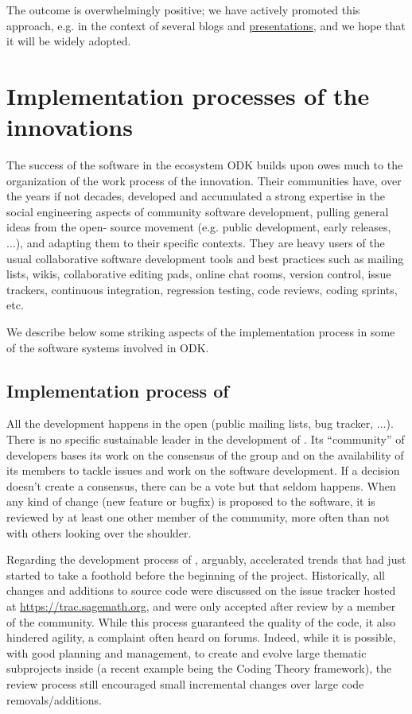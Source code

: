 \documentclass{deliverablereport}
\begin{document}
\begin{description}
  The outcome is overwhelmingly positive; we have actively promoted
  this approach, e.g. in the context of several blogs and
  \href{https://opendreamkit.org/2018/12/14/eu-proposal/}{presentations},
  and we hope that it will be widely adopted.
\end{description}


\section{Implementation processes of the innovations}

The success of the software in the ecosystem ODK builds upon owes much
to the organization of the work process of the innovation.
Their
communities have, over the years if not decades, developed and
accumulated a strong expertise in the social engineering aspects of
community software development, pulling general ideas from the open-
source movement (e.g. public development, early releases, ...), and
adapting them to their specific contexts. They are heavy users of the
usual collaborative software development tools and best practices such
as mailing lists, wikis, collaborative editing pads, online chat
rooms, version control, issue trackers, continuous integration,
regression testing, code reviews, coding sprints, etc.

We describe below some striking aspects of the implementation process
in some of the software systems involved in ODK.

\subsection{Implementation process of \Sage}

All the development happens in the open (public mailing lists, bug
tracker, ...). There is no specific sustainable leader in the
development of \Sage. Its ``community'' of developers bases its work on
the consensus of the group and on the availability of its members to
tackle issues and work on the software development. If a decision
doesn't create a consensus, there can be a vote but that seldom
happens. When any kind of change (new feature or bugfix)
is proposed to the software, it is reviewed
by at least one other member of the community, more often than not
with others looking over the shoulder.

Regarding the development process of \Sage, arguably, \ODK accelerated
trends that had just started to take a foothold before the beginning
of the project. %
Historically, all changes and additions to \Sage source code were
discussed on the issue tracker hosted at
\url{https://trac.sagemath.org}, and were only accepted after review
by a member of the community. %
While this process guaranteed the quality of the code, it also
hindered agility, a complaint often heard on \Sage forums. %
Indeed, while it is possible, with good planning and management, to
create and evolve large thematic subprojects inside \Sage (a recent
example being the Coding Theory framework), the review process still
encouraged small incremental changes over large code
removals/additions.
\end{document}
